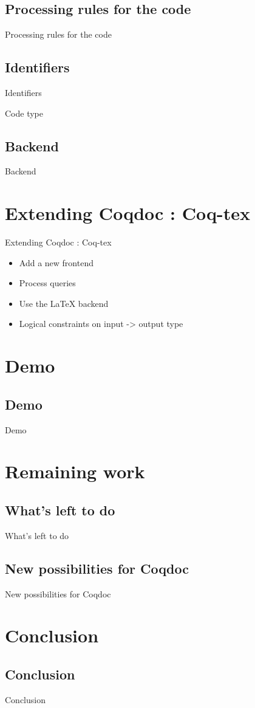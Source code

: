 \documentclass[compress]{beamer}
\newenvironment{tframe}[1]{
  \subsection{#1}
  \begin{frame}{#1}
  }{
  \end{frame}
  }
\begin{document}
  \begin{tframe}{Processing rules for the code}
  \end{tframe}

  \begin{tframe}{Identifiers}
  \end{tframe}

  \begin{frame}{Code type}
  \end{frame}

  \begin{tframe}{Backend}
  \end{tframe}

\section{Extending Coqdoc : Coq-tex}
  \begin{frame}{Extending Coqdoc : Coq-tex}
    \begin{itemize}[<+->]
      \item Add a new frontend
      \item Process queries
      \item Use the LaTeX backend
      \item Logical constraints on input -> output type
    \end{itemize}
  \end{frame}

\section{Demo}
  \begin{tframe}{Demo}
  \end{tframe}

\section{Remaining work}
  \begin{tframe}{What's left to do}
  \end{tframe}
  \begin{tframe}{New possibilities for Coqdoc}
  \end{tframe}

\section{Conclusion}
  \begin{tframe}{Conclusion}
  \end{tframe}
\end{document}
